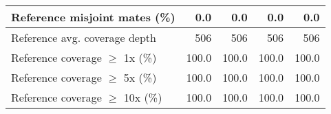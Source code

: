 \documentclass[12pt,a4paper]{article}
\begin{document}
\begin{table}[ht]
\begin{center}
\begin{tabular}{|l*{4}{|r}|}
Reference misjoint mates (\%) & 0.0 & 0.0 & 0.0 & 0.0 \\ \hline
Reference avg. coverage depth & 506 & 506 & 506 & 506 \\ \hline
Reference coverage $\geq$ 1x (\%) & 100.0 & 100.0 & 100.0 & 100.0 \\ \hline
Reference coverage $\geq$ 5x (\%) & 100.0 & 100.0 & 100.0 & 100.0 \\ \hline
Reference coverage $\geq$ 10x (\%) & 100.0 & 100.0 & 100.0 & 100.0 \\ \hline
\end{tabular}
\end{center}
\end{table}
\end{document}
